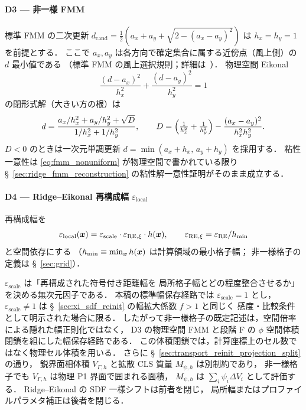 \paragraph{D3 — 非一様 FMM}
標準 FMM の二次更新
$d_{\mathrm{cand}}=\tfrac{1}{2}(a_x+a_y+\sqrt{2-(a_x-a_y)^2})$
は $h_x=h_y=1$ を前提とする．
ここで $a_x, a_y$ は各方向で確定集合に属する近傍点（風上側）の $d$ 最小値である
（標準 FMM の風上選択規則；詳細は~\cite{Sethian1996}）．
物理空間 Eikonal
\begin{equation}
  \frac{(d-a_x)^2}{h_x^2}+\frac{(d-a_y)^2}{h_y^2}=1
  \label{eq:fmm_nonuniform}
\end{equation}
の閉形式解（大きい方の根）は
\begin{equation}
  d = \frac{a_x/h_x^2 + a_y/h_y^2 + \sqrt{D}}
           {1/h_x^2 + 1/h_y^2},\qquad
  D = \Bigl(\tfrac{1}{h_x^2}+\tfrac{1}{h_y^2}\Bigr)
      - \frac{(a_x-a_y)^2}{h_x^2 h_y^2}.
  \label{eq:fmm_closed_form}
\end{equation}
$D<0$ のときは一次元単調更新 $d=\min(a_x+h_x,\,a_y+h_y)$ を採用する．
粘性一意性は \eqref{eq:fmm_nonuniform} が物理空間で書かれている限り
§~\ref{sec:ridge_fmm_reconstruction} の粘性解一意性証明がそのまま成立する．

\paragraph{D4 — Ridge--Eikonal 再構成幅 $\varepsilon_\text{local}$}
再構成幅を
\begin{equation}
  \varepsilon_\text{local}(\bm{x})
  = \varepsilon_\text{scale}\cdot \varepsilon_{\mathrm{RE},\xi} \cdot h(\bm{x}),
  \qquad \varepsilon_{\mathrm{RE},\xi} = \varepsilon_{\mathrm{RE}}/h_\text{min}
  \label{eq:eps_local}
\end{equation}
と空間依存にする
（$h_\text{min} \equiv \min_{\bm{x}} h(\bm{x})$ は計算領域の最小格子幅；
非一様格子の定義は §~\ref{sec:grid}）．

\noindent
$\varepsilon_\text{scale}$ は「再構成された符号付き距離幅を
局所格子幅とどの程度整合させるか」を決める無次元因子である．
本稿の標準幅保存経路では $\varepsilon_\text{scale}=1$ とし，
$\varepsilon_\text{scale}\ne1$ は §~\ref{sec:xi_sdf_reinit} の幅拡大係数 $f>1$ と同じく
感度・比較条件として明示された場合に限る．
したがって非一様格子の既定記述は，空間倍率による隠れた幅正則化ではなく，
D3 の物理空間 FMM と段階 F の $\phi$ 空間体積閉鎖を組にした幅保存経路である．
この体積閉鎖では，計算座標上のセル数ではなく物理セル体積を用いる．
さらに §~\ref{sec:transport_reinit_projection_split} の通り，
鋭界面相体積 $V_{\Gamma,h}$ と拡散 CLS 質量 $M_{\psi,h}$ は別制約であり，
非一様格子でも $V_{\Gamma,h}$ は物理 P1 界面で囲まれる面積，
$M_{\psi,h}$ は $\sum_i\psi_i\Delta V_i$ として評価する．
Ridge--Eikonal の SDF 一様シフトは前者を閉じ，
局所幅またはプロファイルパラメタ補正は後者を閉じる．

